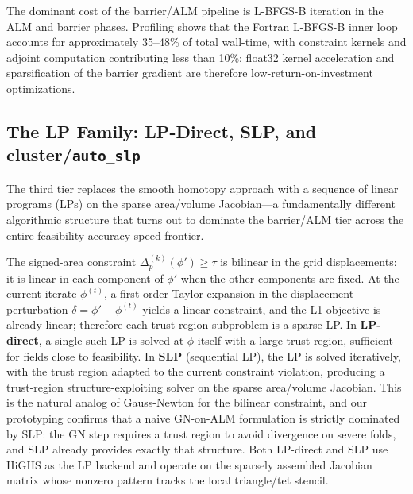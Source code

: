 \documentclass[lettersize,journal]{IEEEtran}
\begin{document}
The dominant cost of the barrier/ALM pipeline is L-BFGS-B iteration in the ALM and barrier phases. Profiling shows that the Fortran L-BFGS-B inner loop accounts for approximately 35--48\% of total wall-time, with constraint kernels and adjoint computation contributing less than 10\%; float32 kernel acceleration and sparsification of the barrier gradient are therefore low-return-on-investment optimizations.

\subsection{The LP Family: LP-Direct, SLP, and cluster/\texttt{auto\_slp}}
\label{sec:lp_family}

The third tier replaces the smooth homotopy approach with a sequence of linear programs (LPs) on the sparse area/volume Jacobian—a fundamentally different algorithmic structure that turns out to dominate the barrier/ALM tier across the entire feasibility-accuracy-speed frontier.

The signed-area constraint $\Delta^{(k)}_p(\phi') \geq \tau$ is bilinear in the grid displacements: it is linear in each component of $\phi'$ when the other components are fixed. At the current iterate $\phi^{(t)}$, a first-order Taylor expansion in the displacement perturbation $\delta = \phi' - \phi^{(t)}$ yields a linear constraint, and the L1 objective is already linear; therefore each trust-region subproblem is a sparse LP. In \textbf{LP-direct}, a single such LP is solved at $\phi$ itself with a large trust region, sufficient for fields close to feasibility. In \textbf{SLP} (sequential LP), the LP is solved iteratively, with the trust region adapted to the current constraint violation, producing a trust-region structure-exploiting solver on the sparse area/volume Jacobian. This is the natural analog of Gauss-Newton for the bilinear constraint, and our prototyping confirms that a naive GN-on-ALM formulation is strictly dominated by SLP: the GN step requires a trust region to avoid divergence on severe folds, and SLP already provides exactly that structure. Both LP-direct and SLP use HiGHS as the LP backend and operate on the sparsely assembled Jacobian matrix whose nonzero pattern tracks the local triangle/tet stencil.
\end{document}
